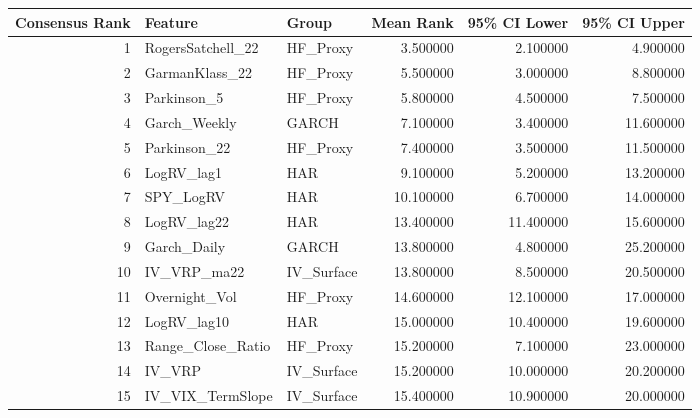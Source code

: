 \begin{tabular}{rllrrr}
\toprule
Consensus Rank & Feature & Group & Mean Rank & 95\% CI Lower & 95\% CI Upper \\
\midrule
1 & RogersSatchell\_22 & HF\_Proxy & 3.500000 & 2.100000 & 4.900000 \\
2 & GarmanKlass\_22 & HF\_Proxy & 5.500000 & 3.000000 & 8.800000 \\
3 & Parkinson\_5 & HF\_Proxy & 5.800000 & 4.500000 & 7.500000 \\
4 & Garch\_Weekly & GARCH & 7.100000 & 3.400000 & 11.600000 \\
5 & Parkinson\_22 & HF\_Proxy & 7.400000 & 3.500000 & 11.500000 \\
6 & LogRV\_lag1 & HAR & 9.100000 & 5.200000 & 13.200000 \\
7 & SPY\_LogRV & HAR & 10.100000 & 6.700000 & 14.000000 \\
8 & LogRV\_lag22 & HAR & 13.400000 & 11.400000 & 15.600000 \\
9 & Garch\_Daily & GARCH & 13.800000 & 4.800000 & 25.200000 \\
10 & IV\_VRP\_ma22 & IV\_Surface & 13.800000 & 8.500000 & 20.500000 \\
11 & Overnight\_Vol & HF\_Proxy & 14.600000 & 12.100000 & 17.000000 \\
12 & LogRV\_lag10 & HAR & 15.000000 & 10.400000 & 19.600000 \\
13 & Range\_Close\_Ratio & HF\_Proxy & 15.200000 & 7.100000 & 23.000000 \\
14 & IV\_VRP & IV\_Surface & 15.200000 & 10.000000 & 20.200000 \\
15 & IV\_VIX\_TermSlope & IV\_Surface & 15.400000 & 10.900000 & 20.000000 \\
\bottomrule
\end{tabular}

